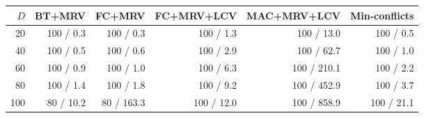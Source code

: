 \begin{tabular}{rrrrrr}
\toprule
$D$ & BT+MRV & FC+MRV & FC+MRV+LCV & MAC+MRV+LCV & Min-conflicts \\
\midrule
20 & 100 / 0.3 & 100 / 0.3 & 100 / 1.3 & 100 / 13.0 & 100 / 0.5 \\
40 & 100 / 0.5 & 100 / 0.6 & 100 / 2.9 & 100 / 62.7 & 100 / 1.0 \\
60 & 100 / 0.9 & 100 / 1.0 & 100 / 6.3 & 100 / 210.1 & 100 / 2.2 \\
80 & 100 / 1.4 & 100 / 1.8 & 100 / 9.2 & 100 / 452.9 & 100 / 3.7 \\
100 & 80 / 10.2 & 80 / 163.3 & 100 / 12.0 & 100 / 858.9 & 100 / 21.1 \\
\bottomrule
\end{tabular}
